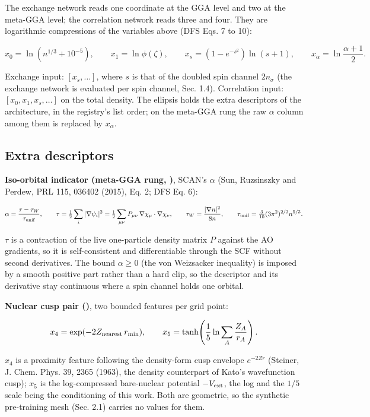 \documentclass[10pt,a4paper]{article}
\begin{document}
The exchange network reads one coordinate at the GGA level and two at the meta-GGA level; the
correlation network reads three and four. They are logarithmic compressions of the variables
above (DFS Eqs. 7 to 10):

\[
x_0 = \ln\!\left(n^{1/3} + 10^{-5}\right), \qquad
x_1 = \ln \phi(\zeta), \qquad
x_s = \left(1 - e^{-s^2}\right)\ln(s + 1), \qquad
x_\alpha = \ln\frac{\alpha + 1}{2}.
\]

Exchange input: $[x_s, \ldots]$, where $s$ is that of the doubled spin channel $2 n_\sigma$ (the
exchange network is evaluated per spin channel, Sec. 1.4). Correlation input:
$[x_0, x_1, x_s, \ldots]$ on the total density. The ellipsis holds the extra descriptors of the
architecture, in the registry's list order; on the meta-GGA rung the raw $\alpha$ column among
them is replaced by $x_\alpha$.

\subsection{Extra descriptors}

\textbf{Iso-orbital indicator (meta-GGA rung, )}, SCAN's $\alpha$ (Sun, Ruzsinszky and
Perdew, PRL 115, 036402 (2015), Eq. 2; DFS Eq. 6):

\[
\alpha = \frac{\tau - \tau_W}{\tau_{\rm unif}}, \qquad
\tau = \tfrac12 \sum_i |\nabla\psi_i|^2 = \tfrac12 \sum_{\mu\nu} P_{\mu\nu}\, \nabla\chi_\mu\cdot\nabla\chi_\nu, \qquad
\tau_W = \frac{|\nabla n|^2}{8n}, \qquad
\tau_{\rm unif} = \tfrac{3}{10}(3\pi^2)^{2/3} n^{5/3}.
\]

$\tau$ is a contraction of the live one-particle density matrix $P$ against the AO gradients,
so it is self-consistent and differentiable through the SCF without second derivatives. The
bound $\alpha \ge 0$ (the von Weizsacker inequality) is imposed by a smooth positive part rather
than a hard clip, so the descriptor and its derivative stay continuous where a spin channel holds
one orbital.

\textbf{Nuclear cusp pair ()}, two bounded features per grid point:

\[
x_4 = \exp(-2 Z_{\rm nearest}\, r_{\min}), \qquad
x_5 = \tanh\!\left(\frac{1}{5}\ln \sum_A \frac{Z_A}{r_A}\right).
\]

$x_4$ is a proximity feature following the density-form cusp envelope $e^{-2Zr}$ (Steiner, J.
Chem. Phys. 39, 2365 (1963), the density counterpart of Kato's wavefunction cusp); $x_5$ is the
log-compressed bare-nuclear potential $-V_{\rm ext}$, the log and the $1/5$ scale being the
conditioning of this work. Both are geometric, so the synthetic pre-training mesh (Sec. 2.1)
carries no values for them.
\end{document}
